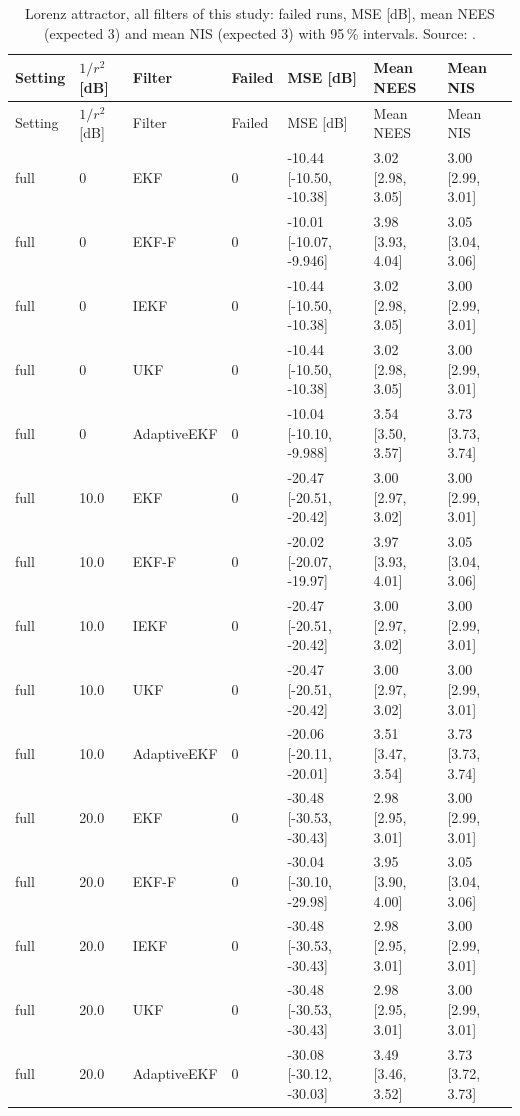 {\scriptsize
\begin{longtable}{lllllll}
\caption{Lorenz attractor, all filters of this study: failed runs, MSE [dB], mean NEES (expected 3) and mean NIS (expected 3) with 95\,\% intervals. Source: .}\label{tab:lorenz_summary}\\
\toprule
Setting & $1/r^2$ [dB] & Filter & Failed & MSE [dB] & Mean NEES & Mean NIS \\
\midrule
\endfirsthead
\toprule
Setting & $1/r^2$ [dB] & Filter & Failed & MSE [dB] & Mean NEES & Mean NIS \\
\midrule
\endhead
full & 0 & EKF & 0 & -10.44 [-10.50, -10.38] & 3.02 [2.98, 3.05] & 3.00 [2.99, 3.01] \\
full & 0 & EKF-F & 0 & -10.01 [-10.07, -9.946] & 3.98 [3.93, 4.04] & 3.05 [3.04, 3.06] \\
full & 0 & IEKF & 0 & -10.44 [-10.50, -10.38] & 3.02 [2.98, 3.05] & 3.00 [2.99, 3.01] \\
full & 0 & UKF & 0 & -10.44 [-10.50, -10.38] & 3.02 [2.98, 3.05] & 3.00 [2.99, 3.01] \\
full & 0 & AdaptiveEKF & 0 & -10.04 [-10.10, -9.988] & 3.54 [3.50, 3.57] & 3.73 [3.73, 3.74] \\
full & 10.0 & EKF & 0 & -20.47 [-20.51, -20.42] & 3.00 [2.97, 3.02] & 3.00 [2.99, 3.01] \\
full & 10.0 & EKF-F & 0 & -20.02 [-20.07, -19.97] & 3.97 [3.93, 4.01] & 3.05 [3.04, 3.06] \\
full & 10.0 & IEKF & 0 & -20.47 [-20.51, -20.42] & 3.00 [2.97, 3.02] & 3.00 [2.99, 3.01] \\
full & 10.0 & UKF & 0 & -20.47 [-20.51, -20.42] & 3.00 [2.97, 3.02] & 3.00 [2.99, 3.01] \\
full & 10.0 & AdaptiveEKF & 0 & -20.06 [-20.11, -20.01] & 3.51 [3.47, 3.54] & 3.73 [3.73, 3.74] \\
full & 20.0 & EKF & 0 & -30.48 [-30.53, -30.43] & 2.98 [2.95, 3.01] & 3.00 [2.99, 3.01] \\
full & 20.0 & EKF-F & 0 & -30.04 [-30.10, -29.98] & 3.95 [3.90, 4.00] & 3.05 [3.04, 3.06] \\
full & 20.0 & IEKF & 0 & -30.48 [-30.53, -30.43] & 2.98 [2.95, 3.01] & 3.00 [2.99, 3.01] \\
full & 20.0 & UKF & 0 & -30.48 [-30.53, -30.43] & 2.98 [2.95, 3.01] & 3.00 [2.99, 3.01] \\
full & 20.0 & AdaptiveEKF & 0 & -30.08 [-30.12, -30.03] & 3.49 [3.46, 3.52] & 3.73 [3.72, 3.73] \\

\end{longtable}}
